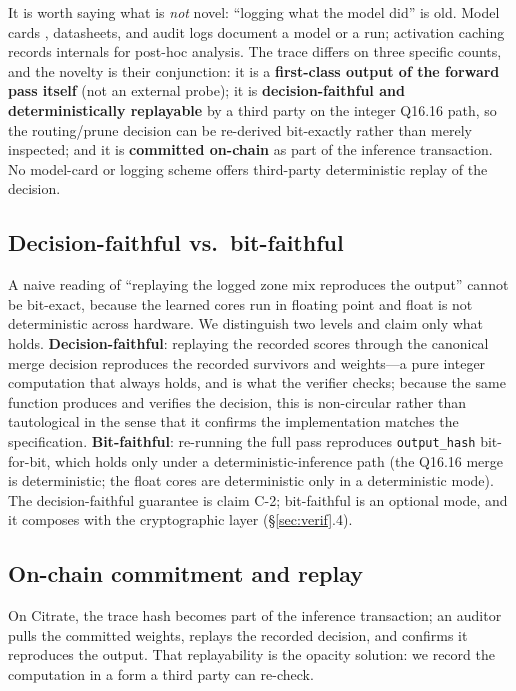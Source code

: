 \documentclass[11pt]{article}
\newcommand{\Qff}{Q16.16}
\begin{document}
It is worth saying what is \emph{not} novel: ``logging what the model did'' is old. Model cards
\citep{mitchell2019model}, datasheets, and audit logs document a model or a run; activation caching
records internals for post-hoc analysis. The trace differs on three specific counts, and the novelty
is their conjunction: it is a \textbf{first-class output of the forward pass itself} (not an external
probe); it is \textbf{decision-faithful and deterministically replayable} by a third party on the
integer \Qff{} path, so the routing/prune decision can be re-derived bit-exactly rather than merely
inspected; and it is \textbf{committed on-chain} as part of the inference transaction. No model-card
or logging scheme offers third-party deterministic replay of the decision.

\subsection{Decision-faithful vs.\ bit-faithful}
A naive reading of ``replaying the logged zone mix reproduces the output'' cannot be bit-exact,
because the learned cores run in floating point and float is not deterministic across hardware. We
distinguish two levels and claim only what holds. \textbf{Decision-faithful}: replaying the recorded
scores through the canonical merge decision reproduces the recorded survivors and weights---a pure
integer computation that always holds, and is what the verifier checks; because the same function
produces and verifies the decision, this is non-circular rather than tautological in the sense that it
confirms the implementation matches the specification. \textbf{Bit-faithful}: re-running the full pass
reproduces \texttt{output\_hash} bit-for-bit, which holds only under a deterministic-inference path
(the \Qff{} merge is deterministic; the float cores are deterministic only in a deterministic mode).
The decision-faithful guarantee is claim C-2; bit-faithful is an optional mode, and it composes with
the cryptographic layer (\S\ref{sec:verif}.4).

\subsection{On-chain commitment and replay}
On Citrate, the trace hash becomes part of the inference transaction; an auditor pulls the committed
weights, replays the recorded decision, and confirms it reproduces the output. That replayability is
the opacity solution: we record the computation in a form a third party can re-check.
\end{document}
